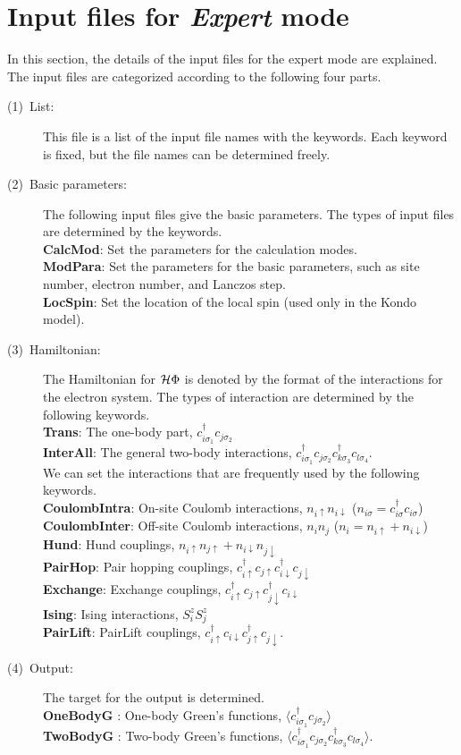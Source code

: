 \section{Input files for {\it Expert} mode}
\label{Ch:HowToExpert}
In this section, the details of the input files for the expert mode are explained. The input files are categorized according to the following four parts.
\begin{description}
\item[(1)~List:] This file is a list of the input file names with the keywords. Each keyword is fixed, but the file names can be determined freely.  
\item[(2)~Basic parameters:] The following input files give the basic parameters. 
The types of input files are determined by the keywords. 
~\\{\bf CalcMod}: Set the parameters for the calculation modes.
~\\{\bf ModPara}: Set the parameters for the basic parameters, such as site number, electron number, and Lanczos step.
~\\{\bf LocSpin}: Set the location of the local spin (used only in the Kondo model). 
\item[(3)~Hamiltonian:] 
The Hamiltonian for $\mathcal{H} \Phi$ is denoted by the format of the interactions for the electron system. 
The types of interaction are determined by the following keywords. 
~\\{\bf Trans}: The one-body part, $c_{i\sigma_1}^{\dag}c_{j\sigma_2}$
~\\{\bf InterAll}: The general two-body interactions, $c_ {i \sigma_1}^{\dag}c_{j\sigma_2}c_{k \sigma_3}^{\dag}c_{l \sigma_4}$.
~\\We can set the interactions that are frequently used by the following keywords. 
~\\{\bf CoulombIntra}: On-site Coulomb interactions, $n_ {i \uparrow}n_{i \downarrow}$ ($n_{i \sigma}=c_{i\sigma}^{\dag}c_{i\sigma}$)
~\\{\bf CoulombInter}: Off-site Coulomb interactions, $n_ {i}n_{j}$ ($n_i=n_{i\uparrow}+n_{i\downarrow}$)
~\\{\bf Hund}: Hund couplings, $n_{i\uparrow}n_{j\uparrow}+n_{i\downarrow}n_{j\downarrow}$
~\\{\bf PairHop}: Pair hopping couplings, $c_ {i \uparrow}^{\dag}c_{j\uparrow}c_{i \downarrow}^{\dag}c_{j  \downarrow}$
~\\{\bf Exchange}: Exchange couplings, $c_ {i \uparrow}^{\dag}c_{j\uparrow}c_{j \downarrow}^{\dag}c_{i  \downarrow}$
~\\{\bf Ising}: Ising interactions, $S_i^z S_j^z$
~\\{\bf PairLift}: PairLift couplings, $c_ {i \uparrow}^{\dag}c_{i\downarrow}c_{j \uparrow}^{\dag}c_{j \downarrow}$.
\item[(4)~Output:] The target for the output is determined.
~\\{\bf OneBodyG }: One-body Green's functions,  $\langle c^{\dagger}_{i\sigma_1}c_{j\sigma_2}\rangle$
~\\{\bf TwoBodyG }: Two-body Green's functions,  $\langle c^{\dagger}_{i\sigma_1}c_{j\sigma_2}c^{\dagger}_{k \sigma_3}c_{l\sigma_4}\rangle$.
\end{description}

